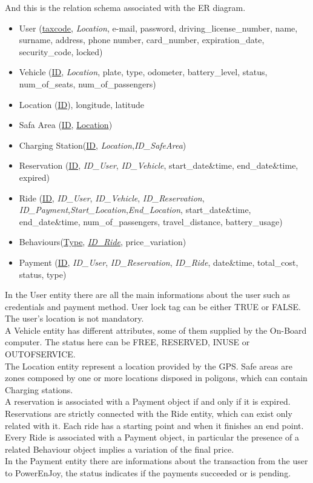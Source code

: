  And this is the relation schema associated with the ER diagram.
\begin{itemize} 
	\item{User (\underline{taxcode}, \textit{Location}, e-mail, password, driving\_license\_number, name, surname, address, phone number, card\_number, expiration\_date, security\_code, locked)}
	\item{Vehicle (\underline{ID}, \textit{Location}, plate, type, odometer, battery\_level, status, num\_of\_seats, num\_of\_passengers) }
	\item{Location (\underline{ID}), longitude, latitude}	
	\item{Safa Area (\underline{ID}, \underline{Location})} %
	\item{Charging Station(\underline{ID}, \textit{Location},\textit{ID\_SafeArea})}
	\item{Reservation (\underline{ID}, \textit{ID\_User}, \textit{ID\_Vehicle}, start\_date\&time, end\_date\&time, expired)}
	\item{Ride (\underline{ID}, \textit{ID\_User}, \textit{ID\_Vehicle}, \textit{ID\_Reservation}, \textit{ID\_Payment},\textit{Start\_Location},\textit{End\_Location}, start\_date\&time, end\_date\&time, num\_of\_passengers, travel\_distance, battery\_usage)}
	\item{Behaviours(\underline{Type}, \underline{\textit{ID\_Ride}}, price\_variation)}
	\item{Payment (\underline{ID}, \textit{ID\_User}, \textit{ID\_Reservation}, \textit{ID\_Ride}, date\&time, total\_cost, status, type)}
\end{itemize}
In the User entity there are all the main informations about the user such as credentials and payment method. User lock tag can be either TRUE or FALSE. The user's location is not mandatory.
\\A Vehicle entity has different attributes, some of them supplied by the On-Board computer. The status here can be FREE, RESERVED, INUSE or OUTOFSERVICE.
\\The Location entity represent a location provided by the GPS. Safe areas are zones composed by one or more locations disposed in poligons, which can contain Charging stations.
\\A reservation is associated with a Payment object if and only if it is expired. Reservations are strictly connected with the Ride entity, which can exist only related with it. Each ride has a starting point and when it finishes an end point. 
\\Every Ride is associated with a Payment object, in particular the presence of a related Behaviour object implies a variation of the final price. 
\\In the Payment entity there are informations about the transaction from the user to PowerEnJoy, the status indicates if the payments succeeded or is pending.
